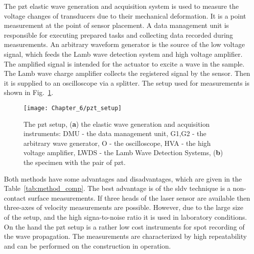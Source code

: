 The \ac{pzt} elastic wave generation and acquisition system is used to measure the voltage changes of transducers due to their mechanical deformation.
It is a point measurement at the point of sensor placement.
A data management unit is responsible for executing prepared tasks and collecting data recorded during measurements.
An arbitrary waveform generator is the source of the low voltage signal, which feeds the Lamb wave detection system and high voltage amplifier.
The amplified signal is intended for the actuator to excite a wave in the sample.
The Lamb wave charge amplifier collects the registered signal by the sensor. 
Then it is supplied to an oscilloscope via a splitter.
The setup used for measurements is shown in Fig.~\ref{fig:pzt_setup}.
\begin{figure}[!htb]
	\begin{center}
		\texttt{[image: Chapter\_6/pzt\_setup]}
	\end{center}
	\caption{The \acf{pzt} setup, (\textbf{a}) the elastic wave generation and acquisition instruments:  DMU - the data management unit, G1,G2 - the arbitrary wave generator, O - the oscilloscope, HVA - the high voltage amplifier, LWDS - the Lamb Wave Detection Systems, (\textbf{b}) the specimen with the pair of \ac{pzt}.}
	\label{fig:pzt_setup}
\end{figure}

Both methods have some advantages and disadvantages, which are given in the Table~\ref{tab:method_comp}.
The best advantage is of the \ac{sldv} technique is a non-contact surface measurements.
If three heads of the laser sensor are available then three-axes of velocity measurements are possible. However, due to the large size of the setup, and the high signa-to-noise ratio it is used in laboratory conditions.
On the hand the \ac{pzt} setup is a rather low cost instruments for spot recording of the wave propagation.
The measurements are characterized by high repeatability and can be performed on the construction in operation.

